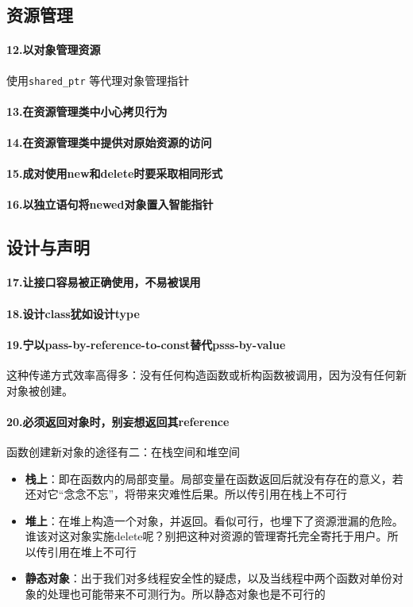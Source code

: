 \documentclass[UTF8,a4paper,12pt]{ctexbook}
\begin{document}
	\subsection{资源管理}
		\paragraph{12.以对象管理资源} 使用\verb|shared_ptr| 等代理对象管理指针
		\paragraph{13.在资源管理类中小心拷贝行为}
		\paragraph{14.在资源管理类中提供对原始资源的访问}
		\paragraph{15.成对使用new和delete时要采取相同形式}
		\paragraph{16.以独立语句将newed对象置入智能指针}
	\subsection{设计与声明}
		\paragraph{17.让接口容易被正确使用，不易被误用}
		\paragraph{18.设计class犹如设计type}
		\paragraph{19.宁以pass-by-reference-to-const替代psss-by-value} 这种传递方式效率高得多：没有任何构造函数或析构函数被调用，因为没有任何新对象被创建。
		
		\paragraph{20.必须返回对象时，别妄想返回其reference}
			函数创建新对象的途径有二：在栈空间和堆空间
			
			\begin{itemize}
				\item \textbf{栈上}：即在函数内的局部变量。局部变量在函数返回后就没有存在的意义，若还对它“念念不忘”，将带来灾难性后果。所以传引用在栈上不可行
				\item \textbf{堆上}：在堆上构造一个对象，并返回。看似可行，也埋下了资源泄漏的危险。谁该对这对象实施delete呢？别把这种对资源的管理寄托完全寄托于用户。所以传引用在堆上不可行
				\item \textbf{静态对象}：出于我们对多线程安全性的疑虑，以及当线程中两个函数对单份对象的处理也可能带来不可测行为。所以静态对象也是不可行的
			\end{itemize}
			
\end{document}

